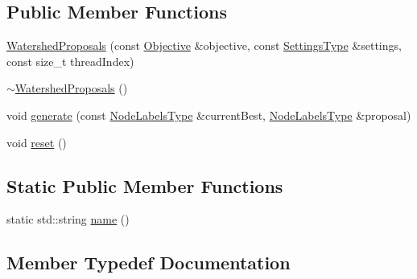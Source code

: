 \subsection*{Public Member Functions}
\begin{DoxyCompactItemize}
\item 
\hyperlink{classnifty_1_1graph_1_1optimization_1_1multicut_1_1WatershedProposals_af01b4b9c54bd0cfcc7d63c18f9e2f909}{Watershed\+Proposals} (const \hyperlink{classnifty_1_1graph_1_1optimization_1_1multicut_1_1WatershedProposals_ab718f52fd4c86362784d507794123a77}{Objective} \&objective, const \hyperlink{structnifty_1_1graph_1_1optimization_1_1multicut_1_1WatershedProposals_1_1SettingsType}{Settings\+Type} \&settings, const size\+\_\+t thread\+Index)
\item 
\hyperlink{classnifty_1_1graph_1_1optimization_1_1multicut_1_1WatershedProposals_a2b5d44322905b88633025b0eede464e2}{$\sim$\+Watershed\+Proposals} ()
\item 
void \hyperlink{classnifty_1_1graph_1_1optimization_1_1multicut_1_1WatershedProposals_a08707d8d165909f93061e9584407dbdc}{generate} (const \hyperlink{classnifty_1_1graph_1_1optimization_1_1multicut_1_1WatershedProposals_a73c2ef9e4f709718cd0ce6c6349a559b}{Node\+Labels\+Type} \&current\+Best, \hyperlink{classnifty_1_1graph_1_1optimization_1_1multicut_1_1WatershedProposals_a73c2ef9e4f709718cd0ce6c6349a559b}{Node\+Labels\+Type} \&proposal)
\item 
void \hyperlink{classnifty_1_1graph_1_1optimization_1_1multicut_1_1WatershedProposals_a7c938f64ae453042d0502c0214a8dada}{reset} ()
\end{DoxyCompactItemize}
\subsection*{Static Public Member Functions}
\begin{DoxyCompactItemize}
\item 
static std\+::string \hyperlink{classnifty_1_1graph_1_1optimization_1_1multicut_1_1WatershedProposals_aedbb9117726ceea9f28564a1862951d2}{name} ()
\end{DoxyCompactItemize}


\subsection{Member Typedef Documentation}
\hypertarget{classnifty_1_1graph_1_1optimization_1_1multicut_1_1WatershedProposals_a830da5754c9f95076be49214815b3093}{}
